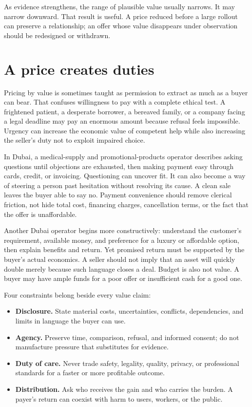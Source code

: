 As evidence strengthens, the range of plausible value usually narrows. It may
narrow downward. That result is useful. A price reduced before a large rollout
can preserve a relationship; an offer whose value disappears under observation
should be redesigned or withdrawn.

\section{A price creates duties}

Pricing by value is sometimes taught as permission to extract as much as a
buyer can bear. That confuses willingness to pay with a complete ethical test.
A frightened patient, a desperate borrower, a bereaved family, or a company
facing a legal deadline may pay an enormous amount because refusal feels
impossible. Urgency can increase the economic value of competent help while
also increasing the seller's duty not to exploit impaired choice.

In Dubai, a medical-supply and promotional-products operator describes asking
questions until objections are exhausted, then making payment easy through
cards, credit, or invoicing. Questioning can uncover fit. It can also become a
way of steering a person past hesitation without resolving its cause. A clean
sale leaves the buyer able to say no. Payment convenience should remove
clerical friction, not hide total cost, financing charges, cancellation terms,
or the fact that the offer is unaffordable.

Another Dubai operator begins more constructively: understand the customer's
requirement, available money, and preference for a luxury or affordable
option, then explain benefits and return. Yet promised return must be supported
by the buyer's actual economics. A seller should not imply that an asset will
quickly double merely because such language closes a deal. Budget is also not
value. A buyer may have ample funds for a poor offer or insufficient cash for a
good one.

Four constraints belong beside every value claim:

\begin{itemize}[leftmargin=1.5em,itemsep=0.15em]
\item \textbf{Disclosure.} State material costs, uncertainties, conflicts,
  dependencies, and limits in language the buyer can use.
\item \textbf{Agency.} Preserve time, comparison, refusal, and informed consent;
  do not manufacture pressure that substitutes for evidence.
\item \textbf{Duty of care.} Never trade safety, legality, quality, privacy, or
  professional standards for a faster or more profitable outcome.
\item \textbf{Distribution.} Ask who receives the gain and who carries the
  burden. A payer's return can coexist with harm to users, workers, or the
  public.
\end{itemize}

